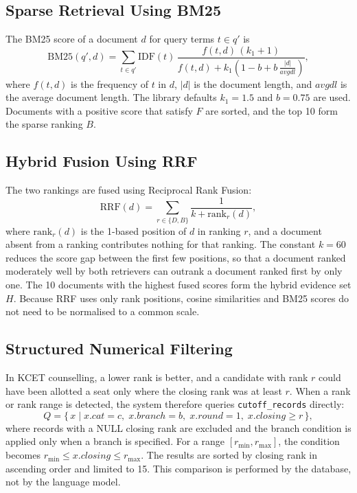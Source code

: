 \documentclass[conference]{IEEEtran}
\begin{document}
\subsection{Sparse Retrieval Using BM25}

The BM25 score of a document $d$ for query terms $t \in q'$ is
\begin{equation}
\mathrm{BM25}(q', d) = \sum_{t \in q'} \mathrm{IDF}(t)\,
\frac{f(t,d)\,(k_1 + 1)}
{f(t,d) + k_1\left(1 - b + b\,\frac{|d|}{\mathit{avgdl}}\right)},
\end{equation}
where $f(t,d)$ is the frequency of $t$ in $d$, $|d|$ is the
document length, and $\mathit{avgdl}$ is the average document
length. The library defaults $k_1 = 1.5$ and $b = 0.75$ are used.
Documents with a positive score that satisfy $F$ are sorted, and
the top 10 form the sparse ranking $B$.

\subsection{Hybrid Fusion Using RRF}

The two rankings are fused using Reciprocal Rank Fusion:
\begin{equation}
\mathrm{RRF}(d) = \sum_{r \in \{D, B\}}
\frac{1}{k + \mathrm{rank}_r(d)},
\end{equation}
where $\mathrm{rank}_r(d)$ is the 1-based position of $d$ in
ranking $r$, and a document absent from a ranking contributes
nothing for that ranking. The constant $k = 60$ \cite{Cormack2009}
reduces the score gap between the first few positions, so that a
document ranked moderately well by both retrievers can outrank a
document ranked first by only one. The 10 documents with the highest
fused scores form the hybrid evidence set $H$. Because RRF uses
only rank positions, cosine similarities and BM25 scores do not
need to be normalised to a common scale.

\subsection{Structured Numerical Filtering}

In KCET counselling, a lower rank is better, and a candidate with
rank $r$ could have been allotted a seat only where the closing
rank was at least $r$. When a rank or rank range is detected, the
system therefore queries \texttt{cutoff\_records} directly:
\begin{equation}
Q = \{\, x \mid x.\mathit{cat} = c,\; x.\mathit{branch} = b,\;
x.\mathit{round} = 1,\; x.\mathit{closing} \geq r \,\},
\end{equation}
where records with a NULL closing rank are excluded and the
branch condition is applied only when a branch is specified. For a
range $[r_{\min}, r_{\max}]$, the condition becomes
$r_{\min} \leq x.\mathit{closing} \leq r_{\max}$. The results are
sorted by closing rank in ascending order and limited to 15.
This comparison is performed by the database, not by the
language model.
\end{document}
